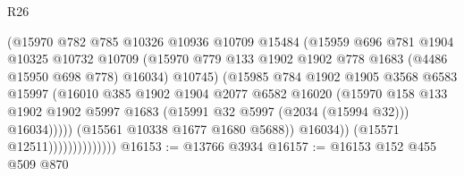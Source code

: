 \begin{lexlean}{R26}
\begin{coremodule}
                                      (@15970
                                        @782
                                        @785
                                        @10326
                                        @10936
                                        @10709
                                        @15484
                                        (@15959
                                          @696
                                          @781
                                          @1904
                                          @10325
                                          @10732
                                          @10709
                                          (@15970
                                            @779
                                            @133
                                            @1902
                                            @1902
                                            @778
                                            @1683
                                            (@4486 @15950 @698 @778)
                                            @16034)
                                          @10745)
                                        (@15985
                                          @784
                                          @1902
                                          @1905
                                          @3568
                                          @6583
                                          @15997
                                          (@16010
                                            @385
                                            @1902
                                            @1904
                                            @2077
                                            @6582
                                            @16020
                                            (@15970
                                              @158
                                              @133
                                              @1902
                                              @1902
                                              @5997
                                              @1683
                                              (@15991 @32 @5997 (@2034 (@15994 @32)))
                                              @16034)))))
                                    (@15561 @10338 @1677 @1680 @5688))
                                  @16034))
                              (@15571 @12511))))))))))))))
@16153 := @13766 @3934
@16157 := @16153 @152 @455 @509 @870

\end{coremodule}
\end{lexlean}
